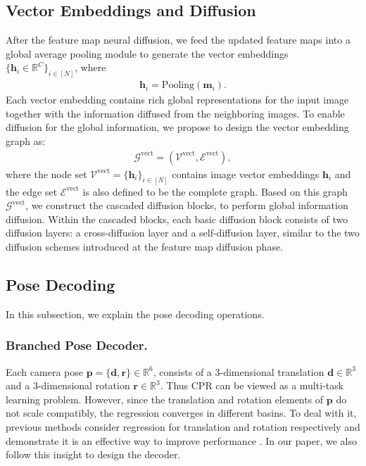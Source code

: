 \documentclass[letterpaper]{article} \usepackage{aaai23}  \usepackage{times}  \usepackage{helvet}  \usepackage{courier}  \usepackage[hyphens]{url}  \usepackage{graphicx} \urlstyle{rm} \def\UrlFont{\rm}  \usepackage{natbib}  \usepackage{caption} \frenchspacing  \setlength{\pdfpagewidth}{8.5in} \setlength{\pdfpageheight}{11in} \usepackage{booktabs}
\theoremstyle{remark}
\theoremstyle{plain}
\newcommand{\mbd}{\bm{d}}
\newcommand{\mbh}{\bm{h}}
\newcommand{\mbm}{\bm{m}}
\newcommand{\mbp}{\bm{p}}
\newcommand{\mbr}{\bm{r}}
\begin{document}
\subsection{Vector Embeddings and Diffusion}
After the feature map neural diffusion, we feed the updated feature maps into a global average pooling module to generate the vector embeddings $\{ \mbh_{i}\in \mathbb{R}^{C} \}_{i\in [N]}$, where
\begin{align}
\mbh_{i}=\mathrm{Pooling} (\mbm_{i}) .
\end{align}
Each vector embedding contains rich global representations for the input image together with the information diffused from the neighboring images. To enable diffusion for the global information, we propose to design the vector embedding graph as:
\begin{align}
\mathcal{G}^{\mathrm{vect}}=(\mathcal{V}^{\mathrm{vect}}, \mathcal{E}^{\mathrm{vect}}),  
\end{align}
where the node set $\mathcal{V}^{\mathrm{vect}}=\{\mbh_{i}\}_{i\in[N]}$ contains image vector embeddings $\mbh_{i}$ and the edge set $\mathcal{E}^{\mathrm{vect}}$ is also defined to be the complete graph. Based on this graph $\mathcal{G}^{\mathrm{vect}}$, we construct the cascaded diffusion blocks, to perform global information diffusion. Within the cascaded blocks, each basic diffusion block consists of two diffusion layers: a cross-diffusion layer and a self-diffusion layer, similar to the two diffusion schemes introduced at the feature map diffusion phase.

\subsection{Pose Decoding}
In this subsection, we explain the pose decoding operations.

\subsubsection{Branched Pose Decoder.}\label{decoder}


Each camera pose $\mbp=\{\mbd,\mbr\}\in\mathbb{R}^{6}$, consists of a 3-dimensional translation $ \mbd\in\mathbb{R}^{3}$ and a 3-dimensional rotation $ \mbr\in \mathbb{R}^{3}$. Thus CPR can be viewed as a multi-task learning problem. However, since the translation and rotation elements of $\mbp$ do not scale compatibly, the regression converges in different basins. To deal with it, previous methods consider regression for translation and rotation respectively and demonstrate it is an effective way to improve performance \cite{irpnet}. In our paper, we also follow this insight to design the decoder.
\end{document}
